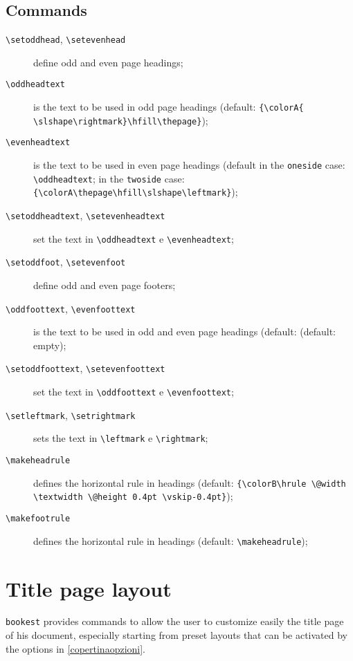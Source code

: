 \documentclass[a4paper,oneside,centered,noparindent,noparskip]{bookest}
\begin{document}
\subsection{Commands}
\begin{description}
 \item[\texttt{\textbackslash setoddhead}, \texttt{\textbackslash setevenhead}] define odd and even page headings;
 \item[\texttt{\textbackslash oddheadtext}] is the text to be used in odd page headings (default: \texttt{\{\textbackslash colorA\{ \textbackslash slshape\textbackslash rightmark\}\textbackslash hfill\textbackslash thepage\}});
 \item[\texttt{\textbackslash evenheadtext}] is the text to be used in even page headings (default in the \texttt{oneside} case: \texttt{\textbackslash oddheadtext}; in the \texttt{twoside} case: \texttt{\{\textbackslash colorA\textbackslash thepage\textbackslash hfill\textbackslash slshape\textbackslash leftmark\}});
 \item[\texttt{\textbackslash setoddheadtext}, \texttt{\textbackslash setevenheadtext}] set the text in \texttt{\textbackslash oddheadtext} e \texttt{\textbackslash evenheadtext};
 \item[\texttt{\textbackslash setoddfoot}, \texttt{\textbackslash setevenfoot}] define odd and even page footers;
 \item[\texttt{\textbackslash oddfoottext}, \texttt{\textbackslash evenfoottext}] is the text to be used in odd and even page headings (default: (default: empty);
 \item[\texttt{\textbackslash setoddfoottext}, \texttt{\textbackslash setevenfoottext}] set the text in \texttt{\textbackslash oddfoottext} e \texttt{\textbackslash evenfoottext};
 \item[\texttt{\textbackslash setleftmark}, \texttt{\textbackslash setrightmark}] sets the text in \texttt{\textbackslash leftmark} e \texttt{\textbackslash rightmark};
 \item[\texttt{\textbackslash makeheadrule}] defines the horizontal rule in headings (default: \texttt{\{\textbackslash colorB\textbackslash hrule \textbackslash @width \textbackslash textwidth \textbackslash @height 0.4pt \textbackslash vskip-0.4pt\}});
 \item[\texttt{\textbackslash makefootrule}] defines the horizontal rule in headings (default: \texttt{\textbackslash makeheadrule});
\end{description}

\section{Title page layout}
\texttt{bookest} provides commands to allow the user to customize easily the title page of his document, especially starting from preset layouts that can be activated by the options in \ref{copertinaopzioni}.
\end{document}
